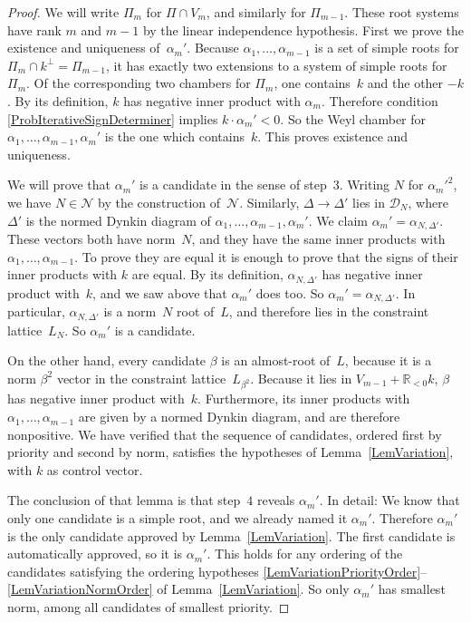 \documentclass[12pt]{amsart}
\def\calD{\mathcal{D}}
\def\calN{\mathcal{N}}
\def\R{\mathbb{R}}
\def\D{\Delta}
\numberwithin{theorem}{section}
\numberwithin{equation}{section}
\numberwithin{figure}{section}
\theoremstyle{remark}
\begin{document}
\begin{proof}
    We will write $\Pi_m$ for $\Pi\cap V_m$, and similarly for $\Pi_{m-1}$.
    These root systems have rank $m$ and $m-1$ by the linear independence
    hypothesis.
    First we prove the existence and uniqueness of~$\alpha_m'$.
    Because $\alpha_1,\dots,\alpha_{m-1}$ is a set of simple roots for
    $\Pi_m\cap k^\perp=\Pi_{m-1}$, it has exactly two extensions to a system of
    simple roots for $\Pi_m$.  Of the corresponding two chambers for $\Pi_m$,
    one  contains~$k$ and 
    the other $-k$.  By its definition, $k$ has negative inner product
    with $\alpha_m$.  Therefore condition \eqref{ProbIterativeSignDeterminer} implies $k\cdot\alpha_m'<0$.
    So the Weyl chamber for $\alpha_1,\dots,\alpha_{m-1},\alpha_m'$ is the 
    one which contains~$k$.  This proves existence and uniqueness. 

    We will prove that $\alpha_m'$ is a candidate in the sense of step~3.
    Writing $N$ for $\alpha_m'^2$, we have
    $N\in\calN$ by the construction of~$\calN$. Similarly, 
    $\D\to\D'$ lies in $\calD_N$, where $\D'$ is the normed Dynkin
    diagram of $\alpha_1,\dots,\alpha_{m-1},\alpha_m'$.
    We claim $\alpha_m'=\alpha_{N,\D'}$.  These vectors both have
    norm~$N$, and they have the same inner products with
    $\alpha_1,\dots,\alpha_{m-1}$.  To prove they are equal it
    is enough to prove that the signs of
    their inner products with $k$ are equal.
    By its definition, $\alpha_{N,\D'}$ has negative inner product
    with~$k$, and we saw above that $\alpha_m'$ does too.  So 
    $\alpha_m'=\alpha_{N,\D'}$.
    In particular, $\alpha_{N,\D'}$ is a norm~$N$ root of~$L$,
    and therefore lies in the constraint lattice~$L_N$.  
    So $\alpha_m'$ is a candidate.

    On the other hand, every candidate $\beta$ is an almost-root of~$L$,
    because it is a norm $\beta^2$ vector  in the constraint lattice~$L_{\beta^2}$.
    Because it lies in $V_{m-1}+\R_{<0}k$, $\beta$ has negative inner product with~$k$.
    Furthermore, its inner products with $\alpha_1,\dots,\alpha_{m-1}$ are 
    given by a normed Dynkin diagram, and are therefore nonpositive.
    We have verified that the sequence of candidates, ordered first by priority
    and second by norm, satisfies the
    hypotheses of  Lemma~\ref{LemVariation}, with $k$ as control vector. 

    The conclusion of that lemma is that
    step~$4$ reveals $\alpha_m'$.
    In detail:
    We know that only one candidate is a simple root, and we
    already named it $\alpha_m'$.
    Therefore $\alpha_m'$ is the only  candidate approved by Lemma~\ref{LemVariation}.  
    The first candidate
    is automatically approved, so it is $\alpha_m'$.
    This holds for any ordering of the candidates satisfying the
    ordering hypotheses \eqref{LemVariationPriorityOrder}--\eqref{LemVariationNormOrder} of Lemma~\ref{LemVariation}.
    So only $\alpha_m'$ has smallest norm, among all candidates of
    smallest priority. 
\end{proof}
\end{document}
